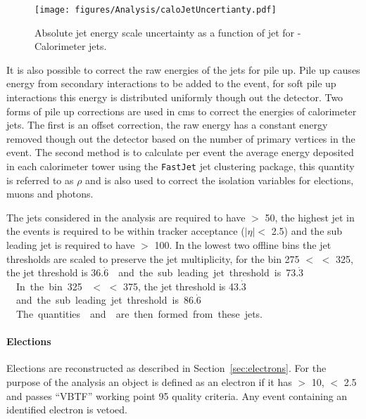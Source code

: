 \begin{figure}[htbp]
  \centering
    \texttt{[image: figures/Analysis/caloJetUncertianty.pdf]}
  \caption{Absolute jet energy scale uncertainty as a function of jet \PT for \AK-Calorimeter jets\cite{1748-0221-6-11-P11002}.}
  \label{fig:figures_Analysis_caloJetUncertianty}
\end{figure}

It is also possible to correct the raw energies of the jets for pile up. Pile up causes energy from secondary interactions to be added to the event, for soft pile up interactions this energy is distributed uniformly though out the detector. Two forms of pile up corrections are used in \ac{cms} to correct the energies of calorimeter jets. The first is an offset correction, the raw energy has a constant energy removed though out the detector based on the number of primary vertices in the event. The second method is to calculate per event the average energy deposited in each calorimeter tower using the \texttt{FastJet}\cite{Cacciari:2011ma,hep-ph/0512210} jet clustering package, this quantity is referred to as $\rho$ and is also used to correct the isolation variables for elections, muons and photons.


The jets considered in the analysis are required to have \ET $>$ \unit{50}{\GeV}, the highest \ET jet in the events is required to be within tracker acceptance ($|\eta| <$ 2.5) and the sub leading jet is required to have \ET $>$ \unit{100}{\GeV}. In the lowest two offline \HT bins the jet thresholds are scaled to preserve the jet multiplicity, for the bin \unit{275}{\GeV} $<$ \HT $<$ \unit{325}{\GeV}, the jet threshold is \unit{36.$\dot{6}$}{\GeV} and the sub leading jet threshold is \unit{73.$\dot{3}$}{\GeV}. In the bin \unit{325}{\GeV} $<$ \HT $<$ \unit{375}{\GeV}, the jet threshold is \unit{43.$\dot{3}$}{\GeV} and the sub leading jet threshold is \unit{86.$\dot{6}$}{\GeV}.

The quantities \HT and \HTm are then formed from these jets.

\paragraph{Elections} %
\label{par:elections}
Elections are reconstructed as described in Section~\ref{sec:electrons}. For 
the purpose of the analysis an object is defined as an electron if it has \PT 
$>$ \unit{10}{\GeV}, \mETA $<$ 2.5 and passes ``VBTF'' working point 95 quality 
criteria\cite{PAS-EGM-10-004}. Any event containing an identified electron is 
vetoed. 

